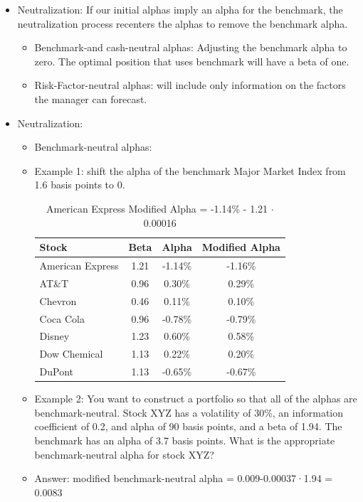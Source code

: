 \begin{itemize}
\begin{itemize}
    \item Closely examine all stocks with alphas greater in magnitude than three times the scale of the alphas.
    \end{itemize}
\item Neutralization: If our initial alphas imply an alpha for the benchmark, the neutralization process recenters the alphas to remove the benchmark alpha.
    \begin{itemize}
    \item Benchmark-and cash-neutral alphas: Adjusting the benchmark alpha to zero. The optimal position that uses benchmark will have a beta of one.
    \item Risk-Factor-neutral alphas: will include only information on the factors the manager can forecast.
   
    \end{itemize}
\item Neutralization:
    \begin{itemize}
        \item Benchmark-neutral alphas:
        \item Example 1: shift the alpha of the benchmark Major Market Index from 1.6 basis points to 0.
        
        \begin{table}[htbp]
            \centering
            \begin{tabular}{lccc}
                \toprule
                Stock & Beta & Alpha & Modified Alpha \\
                \midrule
                American Express & 1.21 & -1.14\% & -1.16\% \\
                AT\&T & 0.96 & 0.30\% & 0.29\% \\
                Chevron & 0.46 & 0.11\% & 0.10\% \\
                Coca Cola & 0.96 & -0.78\% & -0.79\% \\
                Disney & 1.23 & 0.60\% & 0.58\% \\
                Dow Chemical & 1.13 & 0.22\% & 0.20\% \\
                DuPont & 1.13 & -0.65\% & -0.67\% \\
                \bottomrule
            \end{tabular}
            \caption{American Express Modified Alpha = -1.14\% - 1.21 $\cdot$ 0.00016}
        \end{table}



        \item Example 2: You want to construct a portfolio so that all of the alphas are benchmark-neutral. Stock XYZ has a volatility of 30\%, an information coefficient of 0.2, and alpha of 90 basis points, and a beta of 1.94. The benchmark has an alpha of 3.7 basis points. What is the appropriate benchmark-neutral alpha for stock XYZ?
        \item Answer: modified benchmark-neutral alpha = 0.009-0.00037·1.94 = 0.0083
    \end{itemize}
\end{itemize}





